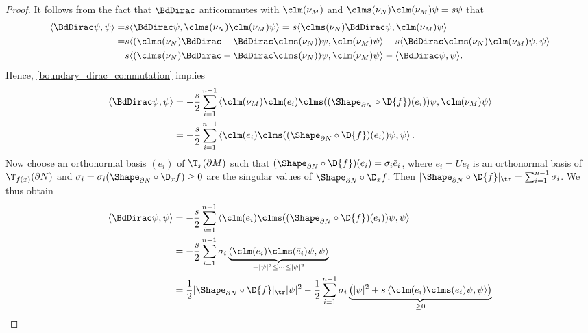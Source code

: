 \documentclass[a4paper,11pt]{amsart}
\numberwithin{equation}{section}
\begin{document}
\begin{proof}
    It follows from the fact that $\BdDirac$ anticommutes with $\clm(\nu_M)$ and \(\clms(\nu_N) \clm(\nu_M)  \psi = s \psi\) that
    \begin{align*}
     \langle \BdDirac\psi,\psi\rangle=  & s \langle \BdDirac \psi, \clms(\nu_N) \clm(\nu_M)\psi \rangle= s\langle\clms(\nu_N)\BdDirac \psi, \clm(\nu_M)\psi \rangle\\
       =&s\langle (\clms(\nu_N)\BdDirac-\BdDirac\clms(\nu_N)) \psi, \clm(\nu_M)\psi \rangle - s\langle \BdDirac\clms(\nu_N) \clm(\nu_M)\psi,\psi\rangle\\
         =&s\langle (\clms(\nu_N)\BdDirac-\BdDirac\clms(\nu_N)) \psi, \clm(\nu_M)\psi \rangle - \langle \BdDirac\psi,\psi\rangle.
    \end{align*}
    Hence, \cref{boundary_dirac_commutation}  implies
    \begin{align*}
        \langle \BdDirac \psi, \psi \rangle &= -\frac{s}{2} \sum_{i=1}^{n-1}  \left\langle \clm(\nu_M) \clm(e_i)\clms( (\Shape_{\partial N} \circ \D{f})(e_i))\psi, \clm(\nu_M) \psi \right\rangle \\
        &= -\frac{s}{2} \sum_{i=1}^{n-1}  \left\langle \clm(e_i)\clms( (\Shape_{\partial N} \circ \D{f})(e_i))\psi, \psi \right\rangle.
    \end{align*}
    Now choose an orthonormal basis \((e_i)\) of \(\T_x(\partial M)\) such that \((\Shape_{\partial N} \circ \D{f})(e_i) = \sigma_i \bar{e}_i\), where \(\bar{e_i} = U e_i\) is an orthonormal basis of \(\T_{f(x)}(\partial N)\) and \(\sigma_i = \sigma_i(\Shape_{\partial N} \circ \D_x{f}) \geq 0\) are the singular values of \(\Shape_{\partial N} \circ \D_x f\).
    Then \(\lvert \Shape_{\partial N} \circ \D{f} \rvert_{\tr} = \sum_{i=1}^{n-1} \sigma_i\).
    We thus obtain
    \begin{align*}
         \langle \BdDirac \psi , \psi \rangle &= -\frac{s}{2} \sum_{i=1}^{n-1} \left\langle \clm(e_i)\clms( (\Shape_{\partial N} \circ \D{f})(e_i))\psi, \psi \right\rangle \\
        &= -\frac{s}{2} \sum_{i=1}^{n-1} 
        \sigma_i \underbrace{ \left\langle \clm(e_i)\clms(\bar{e}_i)\psi, \psi \right\rangle}_{-|\psi|^2 \leq \dots \leq |\psi|^2} \\
        &= \frac{1}{2} \lvert \Shape_{\partial N} \circ \D{f} \rvert_{\tr} \lvert \psi \rvert^2 -\frac{1}{2} \sum_{i=1}^{n-1} 
        \sigma_i \underbrace{\left( \lvert \psi \rvert^2 +  s \left\langle \clm(e_i)\clms(\bar{e}_i)\psi, \psi \right\rangle \right)}_{\geq 0} \\

\end{align*}
\end{proof}
\end{document}
